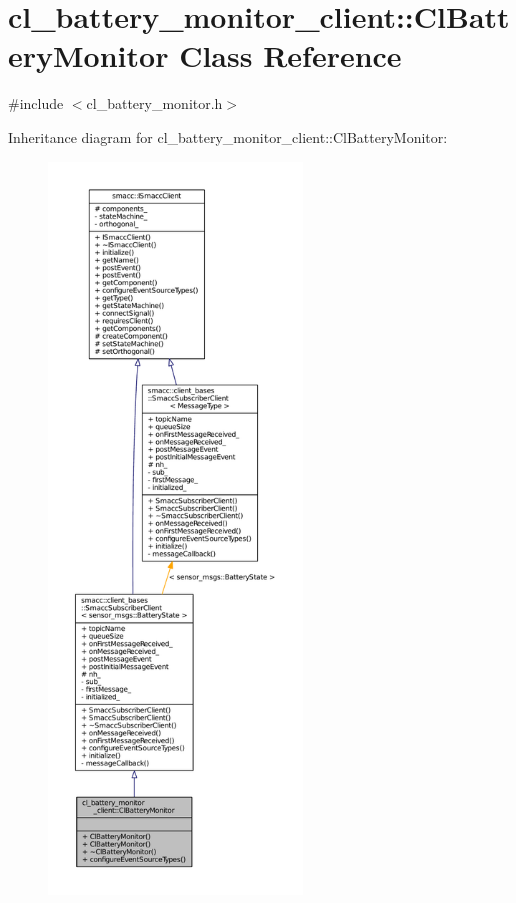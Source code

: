 \hypertarget{classcl__battery__monitor__client_1_1ClBatteryMonitor}{}\section{cl\+\_\+battery\+\_\+monitor\+\_\+client\+:\+:Cl\+Battery\+Monitor Class Reference}
\label{classcl__battery__monitor__client_1_1ClBatteryMonitor}


{\ttfamily \#include $<$cl\+\_\+battery\+\_\+monitor.\+h$>$}



Inheritance diagram for cl\+\_\+battery\+\_\+monitor\+\_\+client\+:\+:Cl\+Battery\+Monitor\+:
\nopagebreak
\begin{figure}[H]
\begin{center}
\leavevmode
\includegraphics[height=550pt]{classcl__battery__monitor__client_1_1ClBatteryMonitor__inherit__graph}
\end{center}
\end{figure}


